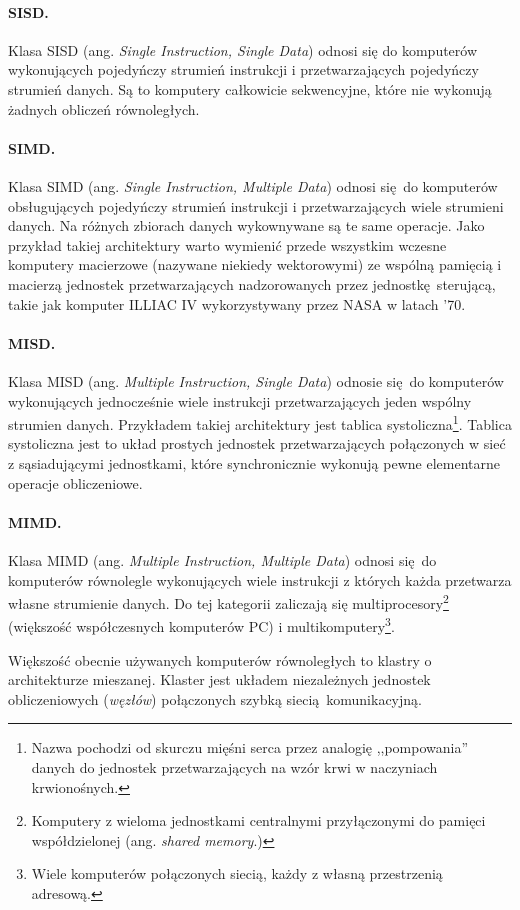 \paragraph{SISD.}
Klasa SISD (ang. \emph{Single Instruction, Single Data}) odnosi się do komputerów wykonujących pojedyńczy strumień instrukcji i przetwarzających pojedyńczy strumień danych. Są to komputery całkowicie sekwencyjne, które nie wykonują żadnych obliczeń równoległych.
\paragraph{SIMD.}
Klasa SIMD (ang. \emph{Single Instruction, Multiple Data}) odnosi się do komputerów obsługujących pojedyńczy strumień instrukcji i przetwarzających wiele strumieni danych. Na różnych zbiorach danych wykownywane są te same operacje. Jako przykład takiej architektury warto wymienić przede wszystkim wczesne komputery macierzowe (nazywane niekiedy wektorowymi) ze wspólną pamięcią i macierzą jednostek przetwarzających nadzorowanych przez jednostkę sterującą, takie jak komputer ILLIAC IV wykorzystywany przez NASA w latach '70.
\paragraph{MISD.}
Klasa MISD (ang. \emph{Multiple Instruction, Single Data}) 
odnosie się do komputerów wykonujących jednocześnie wiele instrukcji przetwarzających jeden wspólny strumien danych. Przykładem takiej architektury jest tablica systoliczna\footnote{Nazwa pochodzi od skurczu mięśni serca przez analogię ,,pompowania'' danych do jednostek przetwarzających na wzór krwi w naczyniach krwionośnych.}. Tablica systoliczna jest to układ prostych jednostek przetwarzających połączonych w sieć z sąsiadującymi jednostkami, które synchronicznie wykonują pewne elementarne operacje obliczeniowe.
\paragraph{MIMD.}
Klasa MIMD  (ang. \emph{Multiple Instruction, Multiple Data})
odnosi się do komputerów równolegle wykonujących wiele instrukcji z których każda przetwarza własne strumienie danych. Do tej kategorii zaliczają się multiprocesory\footnote{Komputery z wieloma jednostkami centralnymi przyłączonymi do pamięci współdzielonej (ang. \emph{shared memory}.)} (większość współczesnych komputerów PC) i multikomputery\footnote{Wiele komputerów połączonych siecią, każdy z własną przestrzenią adresową.}. 


Większość obecnie używanych komputerów równoległych to klastry o architekturze mieszanej. Klaster jest układem niezależnych jednostek obliczeniowych (\emph{węzłów}) połączonych szybką siecią komunikacyjną. 